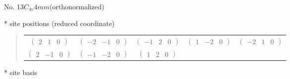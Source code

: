 \documentclass[fleqn,9pt,landscape]{jsarticle}
\begin{document}
\newpage
\begin{center}
\LARGE
No. 13\quad$C_{4v}$\quad$4mm$\quad[ tetragonal ] (orthonormalized)
\end{center}
\vspace{5mm}
* site positions (reduced coordinate)
\begin{quote}
\begin{tabular}{ccccc}
$ \begin{pmatrix} 2 & 1 & 0 \end{pmatrix} $ & $ \begin{pmatrix} -2 & -1 & 0 \end{pmatrix} $ & $ \begin{pmatrix} -1 & 2 & 0 \end{pmatrix} $ & $ \begin{pmatrix} 1 & -2 & 0 \end{pmatrix} $ & $ \begin{pmatrix} -2 & 1 & 0 \end{pmatrix} $ \\
$ \begin{pmatrix} 2 & -1 & 0 \end{pmatrix} $ & $ \begin{pmatrix} -1 & -2 & 0 \end{pmatrix} $ & $ \begin{pmatrix} 1 & 2 & 0 \end{pmatrix} $ & $  $ & $  $
\end{tabular}
\end{quote}
* site basis
\end{document}

